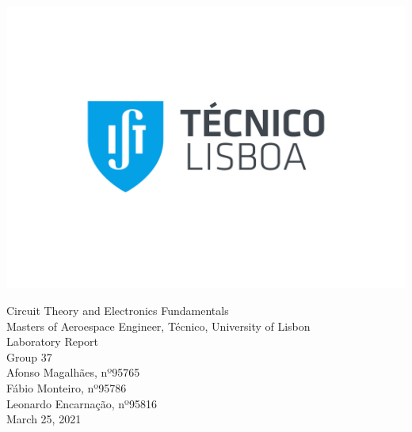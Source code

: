
\thispagestyle {empty}

\includegraphics[bb=9.5cm 11cm 0cm 0cm,scale=0.29]{IST_A_CMYK_POS}

\begin{center}
%
\vspace{1.0cm}
\vspace{1cm}
{\FontLb Circuit Theory and Electronics Fundamentals} \\
\vspace{1cm}
{\FontSn Masters of Aeroespace Engineer, Técnico, University of Lisbon} \\ 
\vspace{1cm}
{\FontSn Laboratory Report} \\
\vspace{5mm}
{\FontSn Group 37} \\
\vspace{1cm}
{\FontSn Afonso Magalhães, nº95765}\\ 
{\FontSn Fábio Monteiro, nº95786}\\
{\FontSn Leonardo Encarnação, nº95816}\\
\vspace{6cm}
{\FontSn March 25, 2021}  
\end{center}

\newpage

